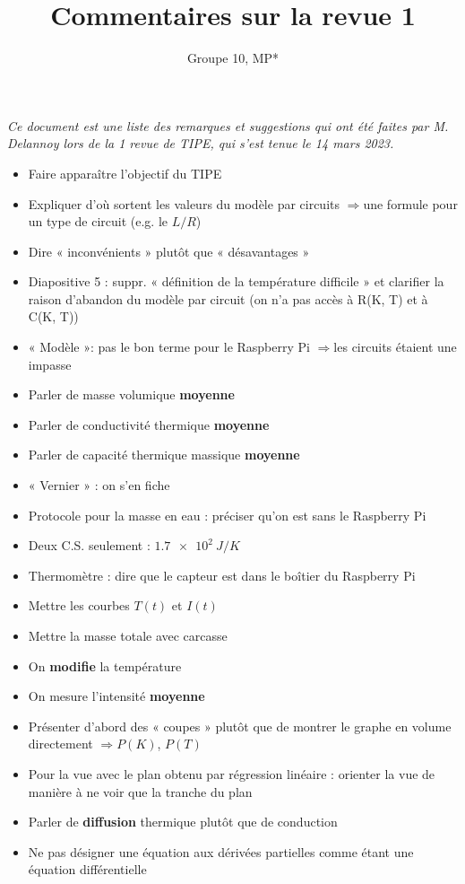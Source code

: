 \documentclass{article}
\title{Commentaires sur la revue 1}
\author{Groupe 10, MP*}
\newcommand{\fleche}{$\Rightarrow {}$}
\begin{document}
\maketitle

\textit{Ce document est une liste des remarques et suggestions qui ont été faites par M. Delannoy lors de la 1 revue de TIPE, qui s'est tenue le 14 mars 2023.}

\vspace{1cm}

\begin{itemize}
    \item Faire apparaître l'objectif du TIPE
    \item Expliquer d'où sortent les valeurs du modèle par circuits \fleche une formule pour un type de circuit (e.g. le $L/R$)
    \item Dire « inconvénients » plutôt que « désavantages »
    \item Diapositive 5 : suppr. « définition de la température difficile » et clarifier la raison d'abandon du modèle par circuit (on n'a pas accès à R(K, T) et à C(K, T))
    \item « Modèle »: pas le bon terme pour le Raspberry Pi \fleche les circuits étaient une impasse
    \item Parler de masse volumique \textbf{moyenne}
    \item Parler de conductivité thermique \textbf{moyenne}
    \item Parler de capacité thermique massique \textbf{moyenne}
    \item « Vernier » : on s'en fiche
    \item Protocole pour la masse en eau : préciser qu'on est sans le Raspberry Pi
    \item Deux C.S. seulement : $\SI{1,7e2}{J/K}$
    \item Thermomètre : dire que le capteur est dans le boîtier du Raspberry Pi
    \item Mettre les courbes $T(t)$ et $I(t)$
    \item Mettre la masse totale avec carcasse
    \item On \textbf{modifie} la température
    \item On mesure l'intensité \textbf{moyenne}
    \item Présenter d'abord des « coupes » plutôt que de montrer le graphe en volume directement \fleche $P(K)$, $P(T)$
    \item Pour la vue avec le plan obtenu par régression linéaire : orienter la vue de manière à ne voir que la tranche du plan
    \item Parler de \textbf{diffusion} thermique plutôt que de conduction
    \item Ne pas désigner une équation aux dérivées partielles comme étant une équation différentielle
\end{itemize}
\end{document}
